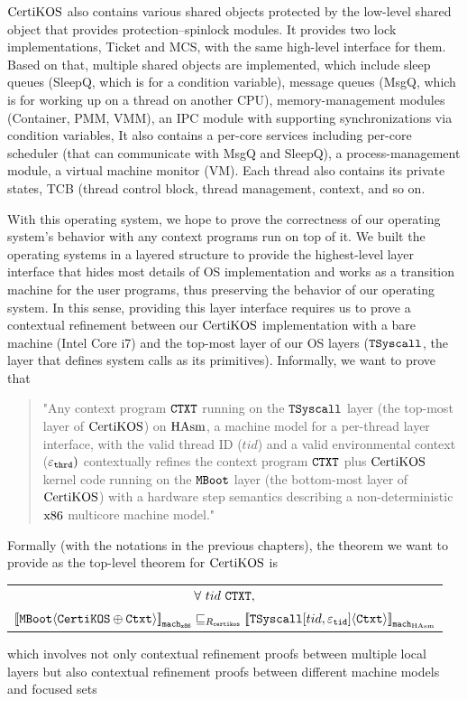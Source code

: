 $\mathrm{CertiKOS}$ also contains various shared objects protected by 
the low-level shared object that provides protection--spinlock modules.
It provides two lock implementations, Ticket and MCS, with the same high-level interface for them. 
Based on that, 
multiple shared objects are implemented, which include
sleep queues (SleepQ, which is for a condition variable), message queues (MsgQ, which is for working up on a thread on another CPU), memory-management modules (Container, PMM, VMM), an IPC module with supporting synchronizations via condition variables, \etc
It also contains a per-core services including per-core scheduler (that can communicate with MsgQ and SleepQ), a process-management module,
a virtual machine monitor (VM). 
Each thread also contains its private states, TCB (thread control block, thread management, context, and so on. 

With this operating system, 
we hope to prove  the correctness of our operating system's behavior with any context programs run on top of it.
We  built the operating systems in a layered structure to provide the highest-level layer interface that hides most details of OS implementation and
works as a transition machine for the user programs, thus preserving the behavior of our operating system.  
In this sense, providing this layer interface requires us 
to prove a contextual refinement between our $\mathrm{CertiKOS}$ implementation with a bare machine (Intel Core i7) and 
the top-most layer of our OS layers (${\mathrm{\texttt{TSyscall}}}$, the layer that defines system calls as its primitives).
Informally, we want to prove that
\begin{quote}
"Any context program ${\mathrm{\texttt{CTXT}}}$ running on the ${\mathrm{\texttt{TSyscall}}}$ layer (the top-most layer of $\mathrm{CertiKOS}$) on $\mathrm{HAsm}$, a machine model for a per-thread layer interface, with the valid thread ID ($tid$)
and a valid environmental context (${\varepsilon}_{{\mathrm{\texttt{thrd}}}})$ 
contextually refines the context program ${\mathrm{\texttt{CTXT}}}$ plus $\mathrm{CertiKOS}$ kernel code running on the ${\mathrm{\texttt{MBoot}}}$ layer (the bottom-most layer of $\mathrm{CertiKOS}$) with a hardware step semantics describing a non-deterministic $\mathrm{x86}$ multicore machine model."
\end{quote}
Formally (with the notations in the previous chapters), the theorem we want to provide as the top-level theorem for $\mathrm{CertiKOS}$ is 
 \begin{center}
\begin{tabular}{c}
$\forall\ tid\  \codeinmath{CTXT},$\\
${[\![{{\mathrm{\texttt{MBoot}}}} \langle {{\mathrm{\texttt{CertiKOS}}} \oplus {\mathrm{\texttt{Ctxt}}}} \rangle]\!]}_{{\mathrm{\texttt{mach}}}_{{\mathrm{\texttt{x86}}}}} \sqsubseteq_{R_{{\mathrm{\texttt{certikos}}}}} {[\![{{\mathrm{\texttt{TSyscall}}}[tid, {\varepsilon}_{{\mathrm{\texttt{tid}}}}]} \langle {{\mathrm{\texttt{Ctxt}}}} \rangle]\!]}_{{{\mathrm{\texttt{mach}}}_{\mathrm{HAsm}}}}$\\
\end{tabular}
\end{center}
which involves not only contextual refinement proofs between multiple local layers but also contextual refinement proofs between
different machine models and focused sets

